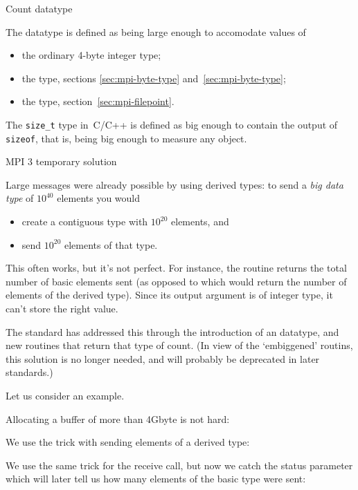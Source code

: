 
 {Count datatype}

The  datatype is defined as being large enough
to accomodate values of
\begin{itemize}
\item the ordinary 4-byte integer type;
\item the  type, sections
  \ref{sec:mpi-byte-type} and~\ref{sec:mpi-byte-type};
\item the  type, section~\ref{sec:mpi-filepoint}.
\end{itemize}

The \lstinline+size_t+ type in~C/C++ is defined as big enough to
contain the output of \lstinline+sizeof+, that is,
being big enough to measure any object.

 {MPI 3 temporary solution}

Large messages were already possible by using 
derived types: to send
a \emph{big data type} of $10^{40}$ elements you would
\begin{itemize}
\item create a contiguous type with $10^{20}$ elements, and
\item send $10^{20}$ elements of that type.
\end{itemize}
This often works, but it's not perfect. For instance, the routine
 returns the total number of basic elements sent
(as opposed to  which would return the number
of elements of the derived type). Since its output argument is
of integer type, it can't store the right value.

The  standard has addressed this
through the introduction of an  datatype,
and new routines that return that type of count.
(In view of the `embiggened' routins, this solution
is no longer needed, and will probably be deprecated in later standards.)

Let us consider an example.

Allocating a buffer of more than 4Gbyte is not hard:

We use the trick with sending elements of a derived type:

We use the same trick for the receive call, but now we catch the status
parameter which will later tell us how many elements of the basic type
were sent:
%

